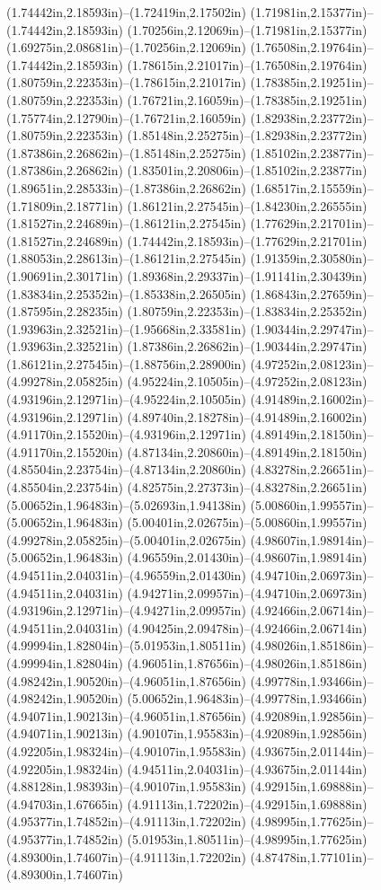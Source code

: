(1.74442in,2.18593in)--(1.72419in,2.17502in) (1.71981in,2.15377in)--(1.74442in,2.18593in) (1.70256in,2.12069in)--(1.71981in,2.15377in) (1.69275in,2.08681in)--(1.70256in,2.12069in) (1.76508in,2.19764in)--(1.74442in,2.18593in) (1.78615in,2.21017in)--(1.76508in,2.19764in) (1.80759in,2.22353in)--(1.78615in,2.21017in) (1.78385in,2.19251in)--(1.80759in,2.22353in) (1.76721in,2.16059in)--(1.78385in,2.19251in) (1.75774in,2.12790in)--(1.76721in,2.16059in) (1.82938in,2.23772in)--(1.80759in,2.22353in) (1.85148in,2.25275in)--(1.82938in,2.23772in) (1.87386in,2.26862in)--(1.85148in,2.25275in) (1.85102in,2.23877in)--(1.87386in,2.26862in) (1.83501in,2.20806in)--(1.85102in,2.23877in) (1.89651in,2.28533in)--(1.87386in,2.26862in) (1.68517in,2.15559in)--(1.71809in,2.18771in) (1.86121in,2.27545in)--(1.84230in,2.26555in) (1.81527in,2.24689in)--(1.86121in,2.27545in) (1.77629in,2.21701in)--(1.81527in,2.24689in) (1.74442in,2.18593in)--(1.77629in,2.21701in) (1.88053in,2.28613in)--(1.86121in,2.27545in) (1.91359in,2.30580in)--(1.90691in,2.30171in) (1.89368in,2.29337in)--(1.91141in,2.30439in) (1.83834in,2.25352in)--(1.85338in,2.26505in) (1.86843in,2.27659in)--(1.87595in,2.28235in) (1.80759in,2.22353in)--(1.83834in,2.25352in) (1.93963in,2.32521in)--(1.95668in,2.33581in) (1.90344in,2.29747in)--(1.93963in,2.32521in) (1.87386in,2.26862in)--(1.90344in,2.29747in) (1.86121in,2.27545in)--(1.88756in,2.28900in) (4.97252in,2.08123in)--(4.99278in,2.05825in) (4.95224in,2.10505in)--(4.97252in,2.08123in) (4.93196in,2.12971in)--(4.95224in,2.10505in) (4.91489in,2.16002in)--(4.93196in,2.12971in) (4.89740in,2.18278in)--(4.91489in,2.16002in) (4.91170in,2.15520in)--(4.93196in,2.12971in) (4.89149in,2.18150in)--(4.91170in,2.15520in) (4.87134in,2.20860in)--(4.89149in,2.18150in) (4.85504in,2.23754in)--(4.87134in,2.20860in) (4.83278in,2.26651in)--(4.85504in,2.23754in) (4.82575in,2.27373in)--(4.83278in,2.26651in) (5.00652in,1.96483in)--(5.02693in,1.94138in) (5.00860in,1.99557in)--(5.00652in,1.96483in) (5.00401in,2.02675in)--(5.00860in,1.99557in) (4.99278in,2.05825in)--(5.00401in,2.02675in) (4.98607in,1.98914in)--(5.00652in,1.96483in) (4.96559in,2.01430in)--(4.98607in,1.98914in) (4.94511in,2.04031in)--(4.96559in,2.01430in) (4.94710in,2.06973in)--(4.94511in,2.04031in) (4.94271in,2.09957in)--(4.94710in,2.06973in) (4.93196in,2.12971in)--(4.94271in,2.09957in) (4.92466in,2.06714in)--(4.94511in,2.04031in) (4.90425in,2.09478in)--(4.92466in,2.06714in) (4.99994in,1.82804in)--(5.01953in,1.80511in) (4.98026in,1.85186in)--(4.99994in,1.82804in) (4.96051in,1.87656in)--(4.98026in,1.85186in) (4.98242in,1.90520in)--(4.96051in,1.87656in) (4.99778in,1.93466in)--(4.98242in,1.90520in) (5.00652in,1.96483in)--(4.99778in,1.93466in) (4.94071in,1.90213in)--(4.96051in,1.87656in) (4.92089in,1.92856in)--(4.94071in,1.90213in) (4.90107in,1.95583in)--(4.92089in,1.92856in) (4.92205in,1.98324in)--(4.90107in,1.95583in) (4.93675in,2.01144in)--(4.92205in,1.98324in) (4.94511in,2.04031in)--(4.93675in,2.01144in) (4.88128in,1.98393in)--(4.90107in,1.95583in) (4.92915in,1.69888in)--(4.94703in,1.67665in) (4.91113in,1.72202in)--(4.92915in,1.69888in) (4.95377in,1.74852in)--(4.91113in,1.72202in) (4.98995in,1.77625in)--(4.95377in,1.74852in) (5.01953in,1.80511in)--(4.98995in,1.77625in) (4.89300in,1.74607in)--(4.91113in,1.72202in) (4.87478in,1.77101in)--(4.89300in,1.74607in) 